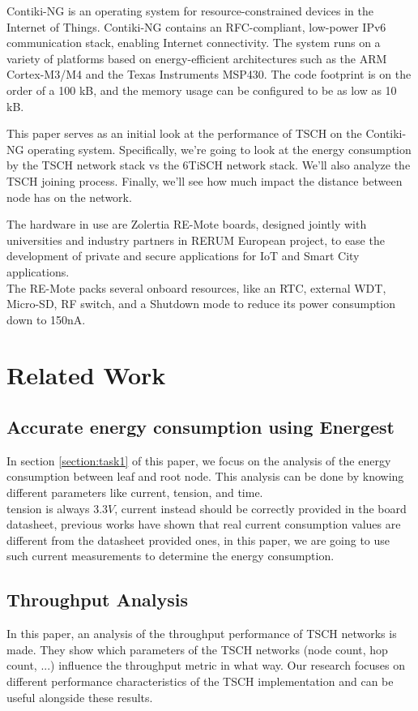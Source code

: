 \documentclass[conference]{IEEEtran}
\begin{document}
Contiki-NG is an operating system for resource-constrained devices in the Internet of Things. Contiki-NG contains an RFC-compliant, low-power IPv6 communication stack, enabling Internet connectivity. The system runs on a variety of platforms based on energy-efficient architectures such as the ARM Cortex-M3/M4 and the Texas Instruments MSP430. The code footprint is on the order of a 100 kB, and the memory usage can be configured to be as low as 10 kB. 

This paper serves as an initial look at the performance of TSCH on the Contiki-NG operating system. Specifically, we're going to look at the energy consumption by the TSCH network stack vs the 6TiSCH network stack. We'll also analyze the TSCH joining process. Finally, we'll see how much impact the distance between node has on the network.

The hardware in use are Zolertia RE-Mote boards, designed jointly with universities and industry partners in RERUM European project, to ease the development of private and secure applications for IoT and Smart City applications.\\
The RE-Mote packs several onboard resources, like an RTC, external WDT, Micro-SD, RF switch, and a Shutdown mode to reduce its power consumption down to 150nA\cite{contiki-NGWiki}.

\section{Related Work}
\subsection{Accurate energy consumption using Energest}
In section \ref{section:task1} of this paper, we focus on the analysis of the energy consumption between leaf and root node. This analysis can be done by knowing different parameters like current, tension, and time.\\
tension is always $3.3V$, current instead should be correctly provided in the board datasheet, previous works have shown that real current consumption values are different from the datasheet provided ones\cite{EnergyConsumption}, in this paper, we are going to use such current measurements to determine the energy consumption.
\subsection{Throughput Analysis} In this paper, an analysis of the throughput performance of TSCH networks is made. They show which parameters of the TSCH networks (node count, hop count, ...) influence the throughput metric in what way. Our research focuses on different performance characteristics of the TSCH implementation and can be useful alongside these results\cite{ThroughputEvaluation}. 
\end{document}
